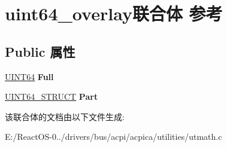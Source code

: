 \hypertarget{unionuint64__overlay}{}\section{uint64\+\_\+overlay联合体 参考}
\label{unionuint64__overlay}
\subsection*{Public 属性}
\begin{DoxyCompactItemize}
\item 
\mbox{\label{unionuint64__overlay_aabf4b2aa54704cd2ab09d4bfa2ef337a}} 
\hyperlink{_processor_bind_8h_a57be03562867144161c1bfee95ca8f7c}{U\+I\+N\+T64} {\bfseries Full}
\item 
\mbox{\label{unionuint64__overlay_ae96ec8d68f21de956d90d268ab0ef8b9}} 
\hyperlink{structuint64__struct}{U\+I\+N\+T64\+\_\+\+S\+T\+R\+U\+CT} {\bfseries Part}
\end{DoxyCompactItemize}


该联合体的文档由以下文件生成\+:\begin{DoxyCompactItemize}
\item 
E\+:/\+React\+O\+S-\/0../drivers/bus/acpi/acpica/utilities/utmath.\+c\end{DoxyCompactItemize}
